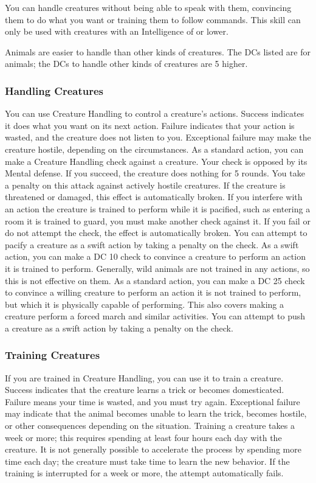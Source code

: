 You can handle creatures without being able to speak with them, convincing them to do what you want or training them to follow commands. This skill can only be used with creatures with an Intelligence of  or lower.

Animals are easier to handle than other kinds of creatures. The DCs listed are for animals; the DCs to handle other kinds of creatures are 5 higher.

\subsubsection{Handling Creatures}
You can use Creature Handling to control a creature's actions. Success indicates it does what you want on its next action. Failure indicates that your action is wasted, and the creature does not listen to you. Exceptional failure may make the creature hostile, depending on the circumstances.
 As a standard action, you can make a Creature Handling check against a creature. Your check is opposed by its Mental defense. If you succeed, the creature does nothing for 5 rounds. You take a  penalty on this attack against actively hostile creatures. If the creature is threatened or damaged, this effect is automatically broken. If you interfere with an action the creature is trained to perform while it is pacified, such as entering a room it is trained to guard, you must make another check against it. If you fail or do not attempt the check, the effect is automatically broken. You can attempt to pacify a creature as a swift action by taking a  penalty on the check.
 As a swift action, you can make a DC 10 check to convince a creature to perform an action it is trained to perform. Generally, wild animals are not trained in any actions, so this is not effective on them.
 As a standard action, you can make a DC 25 check to convince a willing creature to perform an action it is not trained to perform, but which it is physically capable of performing. This also covers making a creature perform a forced march and similar activities. You can attempt to push a creature as a swift action by taking a  penalty on the check.

\subsubsection{Training Creatures}
If you are trained in Creature Handling, you can use it to train a creature. Success indicates that the creature learns a trick or becomes domesticated. Failure means your time is wasted, and you must try again. Exceptional failure may indicate that the animal becomes unable to learn the trick, becomes hostile, or other consequences depending on the situation. Training a creature takes a week or more; this requires spending at least four hours each day with the creature. It is not generally possible to accelerate the process by spending more time each day; the creature must take time to learn the new behavior. If the training is interrupted for a week or more, the attempt automatically fails.

